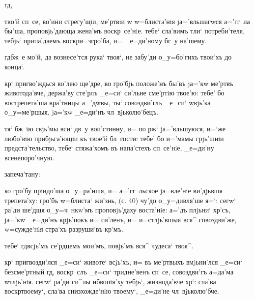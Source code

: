 
 гд, 


 тво'й сп~се, во'ини стрегу'щiи, ме'ртвiи w\т 
w=блиста'нiя jа='вльшагwся а='гг~ла бы'ша, проповjь'дающа 
жена'мъ воскр~се'нiе. тебе` сла'вимъ тли` потреби'теля, 
тебjь` припа'даемъ воскр и=з\ъ гро'ба, и= 
_е=ди'ному бг~у на'шему.

  гд бж~е мо'й, да вознесе'тся 
рука` твоя`, не забу'ди о_у=бо'гихъ твои'хъ до конца`.

 кр` пригво'ждься во'лею ще'дре, во гро'бjь 
положе'нъ бы'въ jа='кw ме'ртвъ животода'вче, держа'ву 
сте'рлъ _е=си` си'льне сме'ртiю твое'ю: тебе' бо 
вострепета'ша вра'тницы а='дwвы, ты` совоздви'глъ _е=си` 
w\т вjь'ка о_у=ме'ршыя, jа='кw _е=ди'нъ чл~вjьколю'бецъ.

     тя` бж~iю 
свjь'мы вси` дв~у вои'стинну, и= по рж` 
jа='вльшуюся, и=`же любо'вiю прибjьга'ющiи къ твое'й 
бл~гости: тебе' бо и='мамы грjь'шнiи предста'тельство, 
тебе` стяжа'хомъ въ напа'стехъ сп~се'нiе, _е=ди'ну 
всенепоро'чную.


  запеча'тану:

 ко гро'бу прiидо'ша о_у=ра'ншя, и= 
а='гг~льское jа=вле'нiе ви'дjьвшя трепета'ху: гро'бъ 
w=блиста` жи'знь, (с. 40) чу'до о_у=дивля'ше я=`: сегw` 
ра'ди ше'дшя о_у=ч~нкw'мъ проповjь'даху воста'нiе: а='дъ 
плjьни` хр'съ, jа='кw _е=ди'нъ крjь'покъ и= си'ленъ, 
и= и=стлjь'вшыя вся^ совоздви'же, w=сужде'нiя стра'хъ 
разруши'въ кр'мъ.

  тебе` гд всjь'мъ се'рдцемъ 
мои'мъ, повjь'мъ вся^ чудеса` твоя^.

 кр` пригвозди'лся _е=си` животе` всjь'хъ, и= 
въ ме'ртвыхъ вмjьни'лся _е=си` безсме'ртный гд, 
воскр~слъ _е=си` тридне'венъ сп~се, совоздви'гъ а=да'ма 
w\т тлjь'нiя. сегw` ра'ди си^лы нб вопiя'ху тебjь`, 
жизнода'вче хр`: сла'ва воскр твоему`, сла'ва 
снизхожде'нiю твоему`, _е=ди'не чл~вjьколю'бче.

